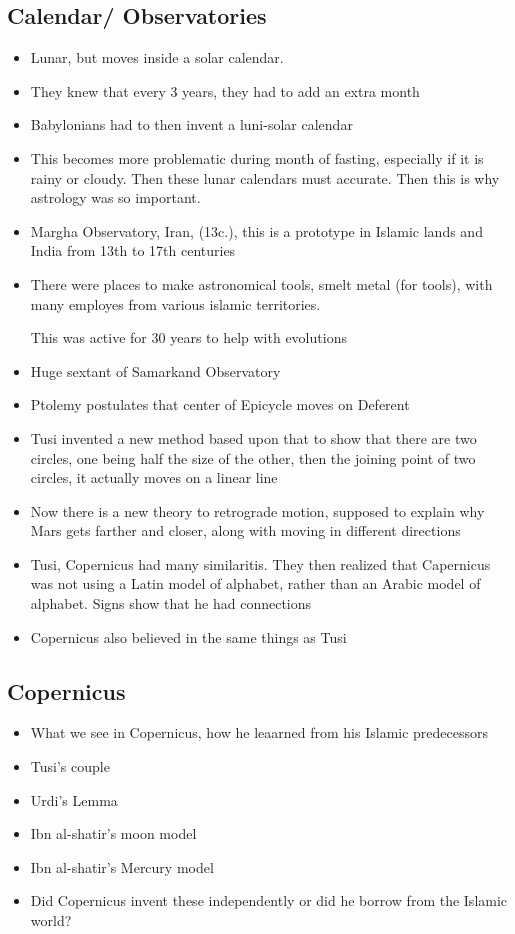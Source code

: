 \documentclass{article}
\begin{document}
\subsection{Calendar/ Observatories}
\begin{itemize}
\item  Lunar, but moves inside a solar calendar.
\item They knew that every 3 years, they had to add an extra month
\item Babylonians had to then invent a luni-solar calendar
\item This becomes more problematic during month of fasting,
  especially if it is rainy or cloudy. Then these lunar calendars
  must accurate. Then this is why astrology was so important.
\item Margha Observatory, Iran, (13c.),
  this is a prototype in Islamic lands and India from 13th to 17th centuries
\item There were places to make astronomical tools, smelt metal (for tools), with
  many employes from various islamic territories.

  This was active for 30 years to help with evolutions
\item Huge sextant of Samarkand Observatory
\item Ptolemy postulates that center of Epicycle moves on Deferent
\item Tusi invented a new method based upon that to show that
  there are two circles, one being half the size of the other,
  then the joining point of two circles, it actually moves on a linear line
\item Now there is a new theory to retrograde motion, supposed to explain
  why Mars gets farther and closer, along with moving in different directions
\item Tusi, Copernicus had many similaritis. They then realized that Capernicus was
  not using a Latin model of alphabet, rather than an Arabic model of alphabet.
  Signs show that he had connections
\item Copernicus also believed in the same things as Tusi
\end{itemize}

\subsection{Copernicus}
\begin{itemize}
  \item What we see in Copernicus,
    how he leaarned from his Islamic predecessors
  \item Tusi's couple
  \item Urdi's Lemma
  \item Ibn al-shatir's moon model
  \item Ibn al-shatir's Mercury model
  \item Did Copernicus invent these independently or did he borrow from
    the Islamic world?
\end{itemize}
\end{document}
